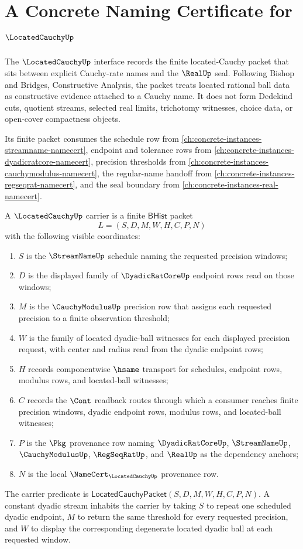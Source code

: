 \chapter{A Concrete Naming Certificate for $\LocatedCauchyUp$}
\label{ch:concrete-instances-locatedcauchy-namecert}

The $\LocatedCauchyUp$ interface records the finite located-Cauchy packet that
sits between explicit Cauchy-rate names and the $\RealUp$ seal. Following
Bishop and Bridges, Constructive Analysis, the packet treats located rational
ball data as constructive evidence attached to a Cauchy name. It does not form
Dedekind cuts, quotient streams, selected real limits, trichotomy witnesses,
choice data, or open-cover compactness objects.

Its finite packet consumes the schedule row from
\autoref{ch:concrete-instances-streamname-namecert}, endpoint and tolerance
rows from \autoref{ch:concrete-instances-dyadicratcore-namecert}, precision
thresholds from \autoref{ch:concrete-instances-cauchymodulus-namecert}, the
regular-name handoff from
\autoref{ch:concrete-instances-regseqrat-namecert}, and the seal boundary from
\autoref{ch:concrete-instances-real-namecert}.

\begin{definition}
\label{def:locatedcauchy-bhist-carrier}
A $\LocatedCauchyUp$ carrier is a finite $\mathsf{BHist}$ packet
$$
L=(S,D,M,W,H,C,P,N)
$$
with the following visible coordinates:
\begin{enumerate}
\item $S$ is the $\StreamNameUp$ schedule naming the requested precision windows;
\item $D$ is the displayed family of $\DyadicRatCoreUp$ endpoint rows read on
those windows;
\item $M$ is the $\CauchyModulusUp$ precision row that assigns each requested
precision to a finite observation threshold;
\item $W$ is the family of located dyadic-ball witnesses for each displayed
precision request, with center and radius read from the dyadic endpoint rows;
\item $H$ records componentwise $\hsame$ transport for schedules, endpoint rows,
modulus rows, and located-ball witnesses;
\item $C$ records the $\Cont$ readback routes through which a consumer reaches
finite precision windows, dyadic endpoint rows, modulus rows, and located-ball
witnesses;
\item $P$ is the $\Pkg$ provenance row naming $\DyadicRatCoreUp$,
$\StreamNameUp$, $\CauchyModulusUp$, $\RegSeqRatUp$, and $\RealUp$ as the
dependency anchors;
\item $N$ is the local $\NameCert_{\LocatedCauchyUp}$ provenance row.
\end{enumerate}
The carrier predicate is
$\mathsf{LocatedCauchyPacket}(S,D,M,W,H,C,P,N)$. A constant dyadic stream
inhabits the carrier by taking $S$ to repeat one scheduled dyadic endpoint, $M$
to return the same threshold for every requested precision, and $W$ to display
the corresponding degenerate located dyadic ball at each requested window.
\end{definition}

